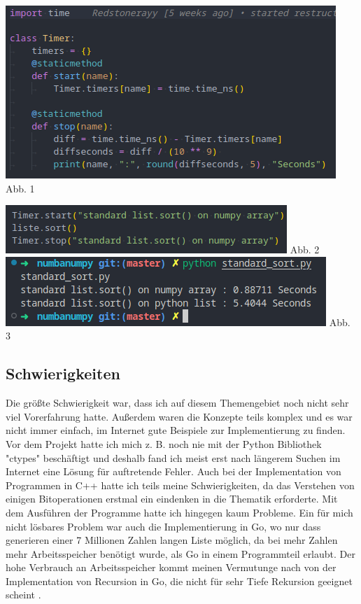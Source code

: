 \documentclass[12pt,a4paper]{article}
\begin{document}
\begin{multicols}{2}
    
    \begin{center}
        \includegraphics[width=.5\textwidth]{screenshots/pythontimer.png}
        Abb. 1
    \end{center}
    
    \columnbreak
    
    \begin{center}
        \includegraphics[width=.5\textwidth]{screenshots/timerexample.png}
        Abb. 2
        \includegraphics[width=.5\textwidth]{screenshots/outputexample.png}
        Abb. 3
    \end{center}
    
\end{multicols}

\subsection{Schwierigkeiten}
Die größte Schwierigkeit war, dass ich auf diesem Themengebiet noch nicht sehr viel Vorerfahrung hatte.
Außerdem waren die Konzepte teils komplex und es war nicht immer einfach, im Internet gute Beispiele zur Implementierung
zu finden. Vor dem Projekt hatte ich mich z. B. noch nie mit der Python Bibliothek "ctypes" beschäftigt und deshalb fand
ich meist erst nach längerem Suchen im Internet eine Lösung für auftretende Fehler.
Auch bei der Implementation von Programmen in C++ hatte ich teils meine Schwierigkeiten, da das Verstehen
von einigen Bitoperationen erstmal ein eindenken in die Thematik erforderte.
Mit dem Ausführen der Programme hatte ich hingegen kaum Probleme.
Ein für mich nicht lösbares Problem war auch die Implementierung in Go, wo nur dass generieren
einer 7 Millionen Zahlen langen Liste möglich, da bei mehr Zahlen mehr Arbeitsspeicher benötigt wurde,
als Go in einem Programmteil erlaubt. Der hohe Verbrauch an Arbeitsspeicher kommt meinen Vermutunge
nach von der Implementation von Recursion in Go, die nicht für sehr Tiefe Rekursion geeignet scheint
\cite{godeeprecursions} \cite{goroutinesize}.
\end{document}
